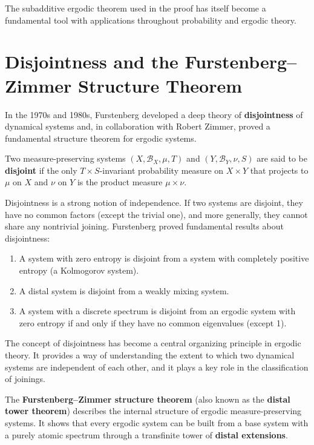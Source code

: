 The subadditive ergodic theorem used in the proof has itself become a fundamental tool with applications throughout probability and ergodic theory.

\section{Disjointness and the Furstenberg--Zimmer Structure Theorem}

In the 1970s and 1980s, Furstenberg developed a deep theory of \textbf{disjointness} of dynamical systems and, in collaboration with Robert Zimmer, proved a fundamental structure theorem for ergodic systems.

\begin{definition}[Disjointness]
Two measure-preserving systems \((X,\mathscr{B}_X,\mu,T)\) and \((Y,\mathscr{B}_Y,\nu,S)\) are said to be \textbf{disjoint} if the only \(T \times S\)-invariant probability measure on \(X \times Y\) that projects to \(\mu\) on \(X\) and \(\nu\) on \(Y\) is the product measure \(\mu \times \nu\).
\end{definition}

Disjointness is a strong notion of independence. If two systems are disjoint, they have no common factors (except the trivial one), and more generally, they cannot share any nontrivial joining. Furstenberg proved fundamental results about disjointness:

\begin{theorem}
\begin{enumerate}
    \item A system with zero entropy is disjoint from a system with completely positive entropy (a Kolmogorov system).
    \item A distal system is disjoint from a weakly mixing system.
    \item A system with a discrete spectrum is disjoint from an ergodic system with zero entropy if and only if they have no common eigenvalues (except 1).
\end{enumerate}
\end{theorem}

The concept of disjointness has become a central organizing principle in ergodic theory. It provides a way of understanding the extent to which two dynamical systems are independent of each other, and it plays a key role in the classification of joinings.

The \textbf{Furstenberg--Zimmer structure theorem} (also known as the \textbf{distal tower theorem}) describes the internal structure of ergodic measure-preserving systems. It shows that every ergodic system can be built from a base system with a purely atomic spectrum through a transfinite tower of \textbf{distal extensions}.

